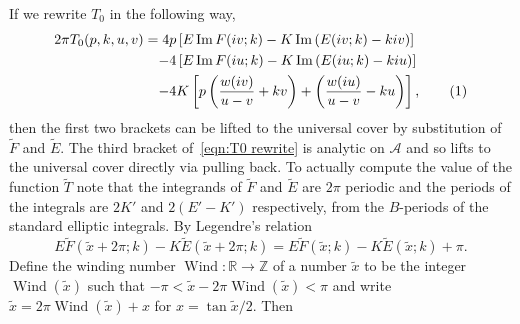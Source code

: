 \documentclass{article}
\numberwithin{equation}{section}
\numberwithin{figure}{section}
\newcommand{\labelthis}[1]{\addtocounter{equation}{1}\tag{\theequation}\label{#1}}
\newcommand{\bra}[1]{\left(#1\right)}
\DeclareMathOperator{\Wind}{Wind}
\DeclareMathOperator{\Imag}{Im}
\newcommand{\iu}{i}
\newcommand{\Z}{\mathbb{Z}}
\newcommand{\R}{\mathbb{R}}
\newcommand{\RInf}{\mathbb{R}\cup\{\infty\}}
\begin{document}
If we rewrite $T_0$ in the following way,
\begin{align*}
2\pi T_0(p,k,u,v) 
= 4p& \left[ E \Imag F(\iu v; k) - K \Imag \left(E(\iu v; k) - k\iu v\right) \right] \\
 -4& \left[ E \Imag F(\iu u; k) - K \Imag \left(E(\iu u; k) - k\iu u\right) \right] \\
 -4& K \left[p\left(\frac{w(\iu v)}{u-v} + kv \right) + \left(\frac{w(\iu u)}{u-v} - ku \right) \right],
\labelthis{eqn:T0 rewrite}
\end{align*}
then the first two brackets can be lifted to the universal cover by substitution of $\tilde{F}$ and $\tilde{E}$. The third bracket of~\eqref{eqn:T0 rewrite} is analytic on $\mathcal{A}$ and so lifts to the universal cover directly via pulling back. 
To actually compute the value of the function $\tilde{T}$ note that the integrands of $\tilde{F}$ and $\tilde{E}$ are $2\pi$ periodic and the periods of the integrals are $2K'$ and $2(E'-K')$ respectively, from the $B$-periods of the standard elliptic integrals. By Legendre's relation
\[
E \tilde F(\tilde{x} + 2\pi; k) - K \tilde E(\tilde{x}+2\pi; k)
= E \tilde F(\tilde{x}; k) - K \tilde E(\tilde{x}; k) + \pi.
\]
Define the winding number $\Wind : \R \to \Z$ of a number $\tilde{x}$ to be the integer $\Wind(\tilde{x})$ such that $-\pi < \tilde{x} - 2\pi\Wind(\tilde{x}) < \pi$  and write $\tilde{x} = 2\pi \Wind(\tilde{x}) + x$ for $x = \tan \tilde{x}/2$. Then
\end{document}
